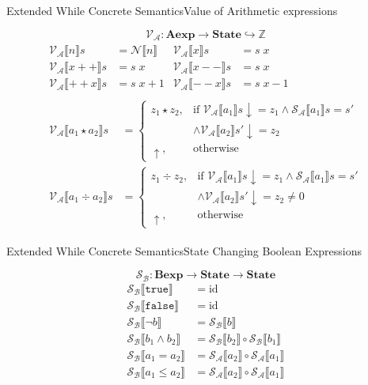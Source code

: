 \documentclass{beamer}
\newcommand{\Aexp}{\textbf{Aexp}}
\newcommand{\Bexp}{\textbf{Bexp}}
\newcommand{\State}{\textbf{State}}
\newcommand{\Z}{\mathbb{Z}}
\newcommand{\true}{\texttt{true}}
\newcommand{\false}{\texttt{false}}
\newcommand{\sem}[2]{\mathcal{#1} \llbracket #2 \rrbracket}
\newcommand{\undefined}{\uparrow}
\newcommand{\defined}{\!\downarrow}
\begin{document}
\begin{frame}{Extended While Concrete Semantics}{Value of Arithmetic expressions}

    $$\mathcal{V_A} : \Aexp \to \State \hookrightarrow \Z$$
    \begin{gather*}
        \begin{aligned}
            \sem{V_A}{n}s     & = \sem{N}{n} &
            \sem{V_A}{x}s     & = s\;x         \\
            \sem{V_A}{x+\!+}s & = s\;x       &
            \sem{V_A}{x-\!-}s & = s\;x         \\
            \sem{V_A}{+\!+x}s & = s\;x+1     &
            \sem{V_A}{-\!-x}s & = s\;x-1
        \end{aligned} \\
        \begin{aligned}
            \sem{V_A}{a_1 \star a_2}s & =
            \begin{cases}
                z_1 \star z_2,
                 & \mbox{if } \sem{V_A}{a_1}s \defined = z_1 \wedge \sem{S_A}{a_1}s = s' \\
                 & \wedge \sem{V_A}{a_2}s' \defined = z_2                                \\
                \undefined,
                 & \mbox{otherwise}
            \end{cases} \\
            \sem{V_A}{a_1 \div a_2}s  & =
            \begin{cases}
                z_1 \div z_2,
                 & \mbox{if } \sem{V_A}{a_1}s \defined = z_1 \wedge \sem{S_A}{a_1}s = s' \\
                 & \wedge \sem{V_A}{a_2}s' \defined = z_2 \neq 0                         \\
                \undefined,
                 & \mbox{otherwise}
            \end{cases}
        \end{aligned}
    \end{gather*}

\end{frame}

\begin{frame}{Extended While Concrete Semantics}{State Changing Boolean Expressions}

    $$\mathcal{S_B} : \Bexp \to \State \to \State$$
    \begin{align*}
        \sem{S_B}{\true}          & = \mathrm{id}                         \\
        \sem{S_B}{\false}         & = \mathrm{id}                         \\
        \sem{S_B}{\neg b}         & = \sem{S_B}{b}                        \\
        \sem{S_B}{b_1 \wedge b_2} & = \sem{S_B}{b_2} \circ \sem{S_B}{b_1} \\
        \sem{S_B}{a_1 = a_2}      & = \sem{S_A}{a_2} \circ \sem{S_A}{a_1} \\
        \sem{S_B}{a_1 \leq a_2}   & = \sem{S_A}{a_2} \circ \sem{S_A}{a_1}
    \end{align*}

\end{frame}
\end{document}
